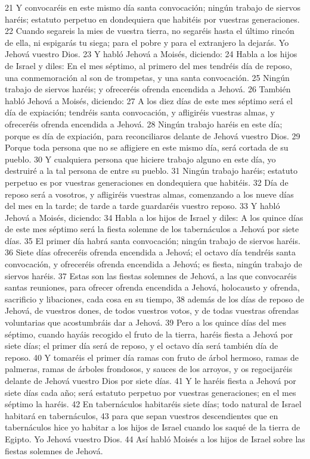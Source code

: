 21 Y convocaréis en este mismo día santa convocación; ningún trabajo de siervos haréis; estatuto perpetuo en dondequiera que habitéis por vuestras generaciones.
22 Cuando segareis la mies de vuestra tierra, no segaréis hasta el último rincón de ella, ni espigarás tu siega; para el pobre y para el extranjero la dejarás. Yo Jehová vuestro Dios.
23 Y habló Jehová a Moisés, diciendo:
24 Habla a los hijos de Israel y diles: En el mes séptimo, al primero del mes tendréis día de reposo, una conmemoración al son de trompetas, y una santa convocación.
25 Ningún trabajo de siervos haréis; y ofreceréis ofrenda encendida a Jehová.
26 También habló Jehová a Moisés, diciendo:
27 A los diez días de este mes séptimo será el día de expiación; tendréis santa convocación, y afligiréis vuestras almas, y ofreceréis ofrenda encendida a Jehová.
28 Ningún trabajo haréis en este día; porque es día de expiación, para reconciliaros delante de Jehová vuestro Dios.
29 Porque toda persona que no se afligiere en este mismo día, será cortada de su pueblo.
30 Y cualquiera persona que hiciere trabajo alguno en este día, yo destruiré a la tal persona de entre su pueblo.
31 Ningún trabajo haréis; estatuto perpetuo es por vuestras generaciones en dondequiera que habitéis.
32 Día de reposo será a vosotros, y afligiréis vuestras almas, comenzando a los nueve días del mes en la tarde; de tarde a tarde guardaréis vuestro reposo.
33 Y habló Jehová a Moisés, diciendo:
34 Habla a los hijos de Israel y diles: A los quince días de este mes séptimo será la fiesta solemne de los tabernáculos a Jehová por siete días.
35 El primer día habrá santa convocación; ningún trabajo de siervos haréis.
36 Siete días ofreceréis ofrenda encendida a Jehová; el octavo día tendréis santa convocación, y ofreceréis ofrenda encendida a Jehová; es fiesta, ningún trabajo de siervos haréis.
37 Estas son las fiestas solemnes de Jehová, a las que convocaréis santas reuniones, para ofrecer ofrenda encendida a Jehová, holocausto y ofrenda, sacrificio y libaciones, cada cosa en su tiempo,
38 además de los días de reposo de Jehová, de vuestros dones, de todos vuestros votos, y de todas vuestras ofrendas voluntarias que acostumbráis dar a Jehová.
39 Pero a los quince días del mes séptimo, cuando hayáis recogido el fruto de la tierra, haréis fiesta a Jehová por siete días; el primer día será de reposo, y el octavo día será también día de reposo.
40 Y tomaréis el primer día ramas con fruto de árbol hermoso, ramas de palmeras, ramas de árboles frondosos, y sauces de los arroyos, y os regocijaréis delante de Jehová vuestro Dios por siete días.
41 Y le haréis fiesta a Jehová por siete días cada año; será estatuto perpetuo por vuestras generaciones; en el mes séptimo la haréis.
42 En tabernáculos habitaréis siete días; todo natural de Israel habitará en tabernáculos,
43 para que sepan vuestros descendientes que en tabernáculos hice yo habitar a los hijos de Israel cuando los saqué de la tierra de Egipto. Yo Jehová vuestro Dios.
44 Así habló Moisés a los hijos de Israel sobre las fiestas solemnes de Jehová.  

